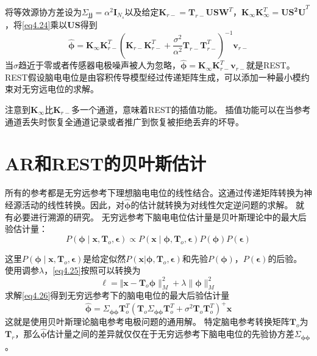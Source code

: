 将等效源协方差设为$\Sigma_\mathbf{jj}=\alpha^2\mathbf{I}_{N_s}$以及给定$\mathbf{K}_{r-}=\mathbf{T}_{r-}\mathbf{USW}^T$，$\mathbf{K}_{\infty}\mathbf{K}_{\infty}^T=\mathbf{US^2U}^T$，将\eqref{eq4.24}乘以$\mathbf{US}$得到
\begin{equation*}
\hat{\mathbf{\phi}}=\mathbf{K}_{\infty}\mathbf{K}_{r-}^T(\mathbf{K}_{r-}\mathbf{K}_{r-}^T+\frac{\sigma^2}{\alpha^2}\mathbf{T}_{r-}\mathbf{T}_{r-}^T)^{-1}\mathbf{v}_{r-}
\end{equation*}
当$\sigma$趋近于零或者传感器电极噪声被人为忽略，$\hat{\mathbf{\phi}}=\mathbf{K}_{\infty}\mathbf{K}_{r-}^T\mathbf{v}_{r-}$就是REST。 REST假设脑电电位是由容积传导模型经过传递矩阵生成，可以添加一种最小模约束对无穷远电位的求解。

注意到$\mathbf{K}_{\infty}$比$\mathbf{K}_{r-}$多一个通道，意味着REST的插值功能。 插值功能可以在当参考通道丢失时恢复全通道记录或者推广到恢复被拒绝丢弃的坏导。

\section{AR和REST的贝叶斯估计}
所有的参考都是无穷远参考下理想脑电电位的线性结合。这通过传递矩阵转换为神经源活动的线性转换。因此，对$\hat{\mathbf{\phi}}$的估计就转换为对线性欠定逆问题的求解。 就有必要进行溯源的研究。 无穷远参考下脑电电位估计量是贝叶斯理论中的最大后验估计量：
\begin{equation}\label{eq4.25}
P(\mathbf{\phi}\mid\mathbf{x},\mathbf{T}_o,\mathbf{\epsilon})\propto{P(\mathbf{x}\mid\mathbf{\phi},\mathbf{T}_o,\mathbf{\epsilon})P(\mathbf{\phi})P(\mathbf{\epsilon})}
\end{equation}

这里$P(\mathbf{\phi}\mid\mathbf{x},\mathbf{T}_o,\mathbf{\epsilon})$是给定似然$P(\mathbf{x}|\mathbf{\phi},\mathbf{T}_o,\mathbf{\epsilon})$和先验$P(\mathbf{\phi})$，$P(\mathbf{\epsilon})$的后验。 使用调参$\lambda$，\eqref{eq4.25}按照\cite{noauthor_mardia_nodate}可以转换为
\begin{equation}\label{eq4.26}
\ell = \Vert\mathbf{x}-\mathbf{T}_o\mathbf{\phi}\rVert_M^2+\lambda\lVert\mathbf{\phi}\rVert_M^2
\end{equation}
求解\eqref{eq4.26}得到无穷远参考下的脑电电位的最大后验估计量
\begin{equation}\label{eq4.27}
\hat{\mathbf{\phi}}=\Sigma_\mathbf{\phi\phi}\mathbf{T}_o^T(\mathbf{T}_o\Sigma_\mathbf{\phi\phi}\mathbf{T}_o^T+\sigma^2\mathbf{T}_o\mathbf{T}_o^T)^+\mathbf{x}
\end{equation}
这就是使用贝叶斯理论脑电参考电极问题的通用解。 特定脑电参考转换矩阵$\mathbf{T}_o$为$\mathbf{T}_r$，那么$\hat{\mathbf{\phi}}$估计量之间的差异就仅仅在于无穷远参考下脑电电位的先验协方差$\Sigma_{\mathbf{\phi\phi}}$。

